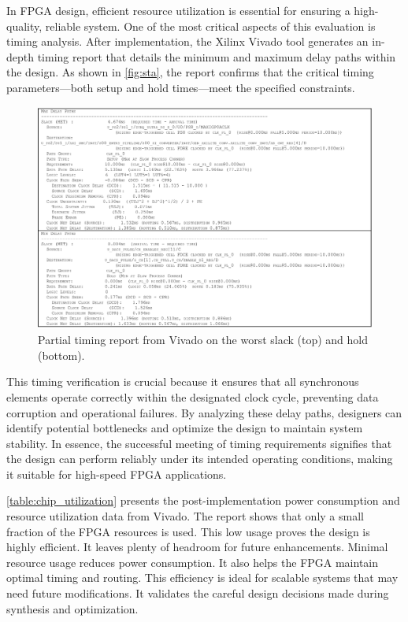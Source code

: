 In FPGA design, efficient resource utilization is essential for ensuring a high-quality, reliable system. One of the most critical aspects of this evaluation is timing analysis. After implementation, the Xilinx Vivado tool generates an in-depth timing report that details the minimum and maximum delay paths within the design. As shown in \autoref{fig:sta}, the report confirms that the critical timing parameters—both setup and hold times—meet the specified constraints.
\begin{figure}[h]
    \centering
    \includegraphics[width=1\linewidth]{figures/timimg_report.png}
    \caption{Partial timing report from Vivado on the worst slack (top) and hold (bottom).}
    \label{fig:sta}
\end{figure}
This timing verification is crucial because it ensures that all synchronous elements operate correctly within the designated clock cycle, preventing data corruption and operational failures. By analyzing these delay paths, designers can identify potential bottlenecks and optimize the design to maintain system stability. In essence, the successful meeting of timing requirements signifies that the design can perform reliably under its intended operating conditions, making it suitable for high-speed FPGA applications.

\autoref{table:chip_utilization} presents the post-implementation power consumption and resource utilization data from Vivado. The report shows that only a small fraction of the FPGA resources is used. This low usage proves the design is highly efficient. It leaves plenty of headroom for future enhancements. Minimal resource usage reduces power consumption. It also helps the FPGA maintain optimal timing and routing. This efficiency is ideal for scalable systems that may need future modifications. It validates the careful design decisions made during synthesis and optimization.

